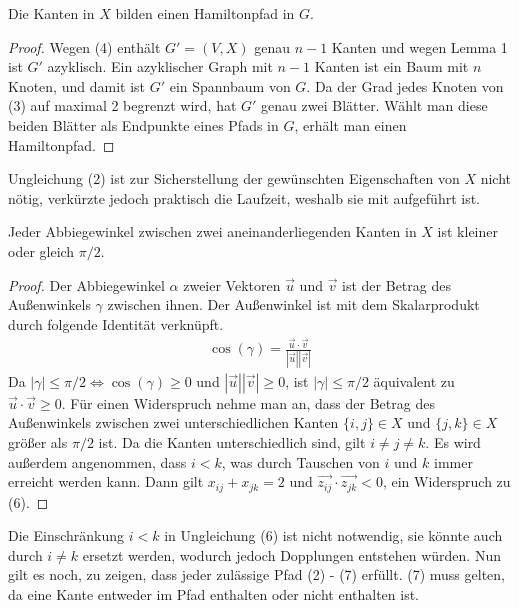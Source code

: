 \documentclass[a4paper, 10pt, ngerman]{article}
\begin{document}
\begin{lemma}
    Die Kanten in $X$ bilden einen Hamiltonpfad in $G$.
\end{lemma}

\begin{proof}
    Wegen (4) enthält $G' = (V, X)$ genau $n - 1$ Kanten und wegen Lemma 1 ist $G'$ azyklisch. Ein azyklischer Graph mit $n - 1$ Kanten ist ein Baum mit $n$ Knoten, und damit ist $G'$ ein Spannbaum von $G$. Da der Grad jedes Knoten von (3) auf maximal 2 begrenzt wird, hat $G'$ genau zwei Blätter. Wählt man diese beiden Blätter als Endpunkte eines Pfads in $G$, erhält man einen Hamiltonpfad.
\end{proof}
 
Ungleichung (2) ist zur Sicherstellung der gewünschten Eigenschaften von $X$ nicht nötig, verkürzte jedoch praktisch die Laufzeit, weshalb sie mit aufgeführt ist.

\begin{lemma}
    Jeder Abbiegewinkel zwischen zwei aneinanderliegenden Kanten in $X$ ist kleiner oder gleich $\pi / 2$.
\end{lemma}

\begin{proof}
    Der Abbiegewinkel $\alpha$ zweier Vektoren $\vec{u}$ und $\vec{v}$ ist der Betrag des Außenwinkels $\gamma$ zwischen ihnen. Der Außenwinkel ist mit dem Skalarprodukt durch folgende Identität verknüpft.
    \begin{align*}
        \cos(\gamma) = \frac {\vec{u} \cdot \vec{v}} {|\vec{u}||\vec{v}|}
    \end{align*}
    Da $|\gamma| \le \pi / 2 \Longleftrightarrow \cos(\gamma) \ge 0$ und $|\vec{u}| |\vec{v}| \ge 0$, ist $|\gamma| \le \pi / 2$ äquivalent zu $\vec{u} \cdot \vec{v} \ge 0$. Für einen Widerspruch nehme man an, dass der Betrag des Außenwinkels zwischen zwei unterschiedlichen Kanten $\{i, j\} \in X$ und $\{j, k\} \in X$ größer als $\pi / 2$ ist. Da die Kanten unterschiedlich sind, gilt $i \ne j \ne k$. Es wird außerdem angenommen, dass $i < k$, was durch Tauschen von $i$ und $k$ immer erreicht werden kann. Dann gilt $x_{ij} + x_{jk} = 2$ und $\vec{z_{ij}} \cdot \vec{z_{jk}} < 0$, ein Widerspruch zu (6). 
\end{proof}

Die Einschränkung $i < k$ in Ungleichung (6) ist nicht notwendig, sie könnte auch durch $i \ne k$ ersetzt werden, wodurch jedoch Dopplungen entstehen würden. Nun gilt es noch, zu zeigen, dass jeder zulässige Pfad (2) - (7) erfüllt. (7) muss gelten, da eine Kante entweder im Pfad enthalten oder nicht enthalten ist.
\end{document}
